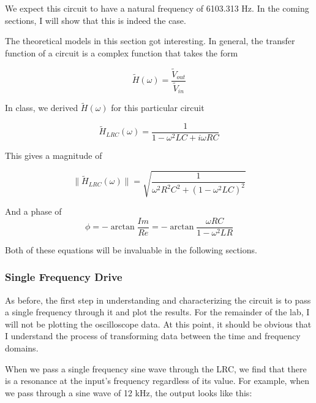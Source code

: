 \documentclass{article}
\begin{document}
We expect this circuit to have a natural frequency of 6103.313 Hz. In the
coming sections, I will show that this is indeed the case. 

The theoretical models in this section got interesting. In general, the
transfer function of a circuit is a complex function that takes the form

\begin{equation}
    \tilde{H}(\omega) = \frac{\tilde{V}_{out}}{\tilde{V}_{in}}
\end{equation}

In class, we derived $\tilde{H}(\omega)$ for this particular circuit

\begin{equation}
    \tilde{H}_{LRC}(\omega) = \frac{1}{1 - \omega^2 L C + i \omega R C}
\end{equation}

This gives a magnitude of

\begin{equation}
    \|\tilde{H}_{LRC}(\omega)\| = \sqrt{\frac{1}{ \omega^2 R^2 C^2 + (1 -  \omega^ 2 L C)^2}}
\end{equation}

And a phase of 
\begin{equation}
    \phi = -\arctan{\frac{Im}{Re}} = -\arctan{\frac{\omega R C}{1 - \omega^2 L R}}
\end{equation}

Both of these equations will be invaluable in the following sections.

\subsubsection{Single Frequency Drive}%
\label{ssub:single_frequency_drive}

As before, the first step in understanding and characterizing the circuit is to
pass a single frequency through it and plot the results. For the remainder of
the lab, I will not be plotting the oscilloscope data. At this point, it should
be obvious that I understand the process of transforming data between the time
and frequency domains. 

When we pass a single frequency sine wave through the LRC, we find that there
is a resonance at the input's frequency regardless of its value. For example,
when we pass through a sine wave of 12 kHz, the output looks like this:
\end{document}

